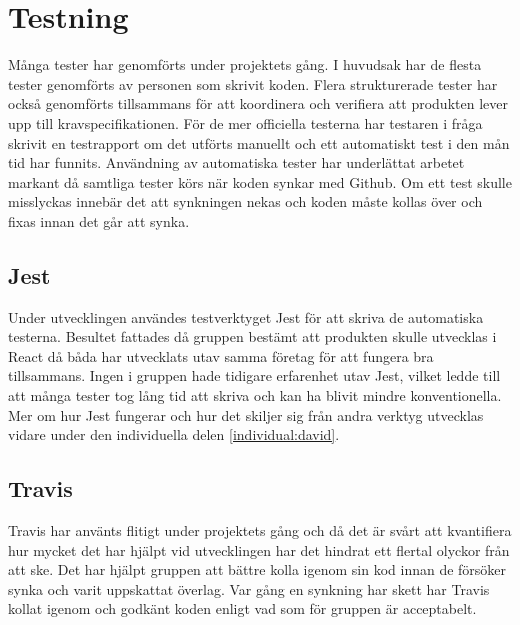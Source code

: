 \section{Testning}
Många tester har genomförts under projektets gång. I huvudsak har de flesta tester genomförts av personen som skrivit koden. Flera strukturerade tester har också genomförts tillsammans för att koordinera och verifiera att produkten lever upp till kravspecifikationen. För de mer officiella testerna har testaren i fråga skrivit en testrapport om det utförts manuellt och ett automatiskt test i den mån tid har funnits. Användning av automatiska tester har underlättat arbetet markant då samtliga tester körs när koden synkar med Github. Om ett test skulle misslyckas innebär det att synkningen nekas och koden måste kollas över och fixas innan det går att synka.
\subsection{Jest}
Under utvecklingen användes testverktyget Jest för att skriva de automatiska testerna. Besultet fattades då gruppen bestämt att produkten skulle utvecklas i React då båda har utvecklats utav samma företag för att fungera bra tillsammans. Ingen i gruppen hade tidigare erfarenhet utav Jest, vilket ledde till att många tester tog lång tid att skriva och kan ha blivit mindre konventionella. Mer om hur Jest fungerar och hur det skiljer sig från andra verktyg utvecklas vidare under den individuella delen \ref{individual:david}.
\subsection{Travis}
Travis har använts flitigt under projektets gång och då det är svårt att kvantifiera hur mycket det har hjälpt vid utvecklingen har det hindrat ett flertal olyckor från att ske. Det har hjälpt gruppen att bättre kolla igenom sin kod innan de försöker synka och varit uppskattat överlag. Var gång en synkning har skett har Travis kollat igenom och godkänt koden enligt vad som för gruppen är acceptabelt. 